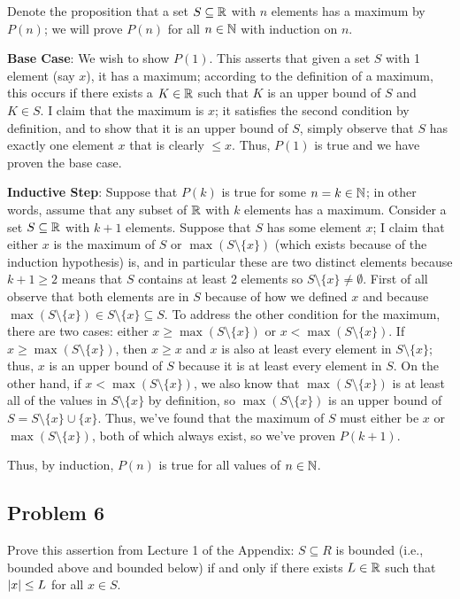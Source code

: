 \documentclass[main.tex]{subfiles}
\begin{document}
\begin{soln}
    Denote the proposition that a set $S\subseteq \mathbb R$ with $n$ elements has a maximum by $P(n)$; we will prove $P(n)$ for all $n\in \mathbb N$ with induction on $n$.

    \textbf{Base Case}: We wish to show $P(1)$. This asserts that given a set $S$ with 1 element (say $x$), it has a maximum; according to the definition of a maximum, this occurs if there exists a $K\in \mathbb R$ such that $K$ is an upper bound of $S$ and $K\in S$. I claim that the maximum is $x$; it satisfies the second condition by definition, and to show that it is an upper bound of $S$, simply observe that $S$ has exactly one element $x$ that is clearly $\le x$. Thus, $P(1)$ is true and we have proven the base case.

    \textbf{Inductive Step}: Suppose that $P(k)$ is true for some $n = k\in \mathbb N$; in other words, assume that any subset of $\mathbb R$ with $k$ elements has a maximum. Consider a set $S\subseteq \mathbb R$ with $k + 1$ elements. Suppose that $S$ has some element $x$; I claim that either $x$ is the maximum of $S$ or $\max (S\setminus \{x\})$ (which exists because of the induction hypothesis) is, and in particular these are two distinct elements because $k + 1\ge 2$ means that $S$ contains at least 2 elements so $S\setminus\{x\}\neq \emptyset$. First of all observe that both elements are in $S$ because of how we defined $x$ and because $\max (S\setminus\{x\})\in S\setminus\{x\}\subseteq S$. To address the other condition for the maximum, there are two cases: either $x \ge \max (S\setminus \{x\})$ or $x < \max (S\setminus \{x\})$. If $x\ge \max (S\setminus \{x\})$, then $x \ge x$ and $x$ is also at least every element in $S\setminus \{x\}$; thus, $x$ is an upper bound of $S$ because it is at least every element in $S$. On the other hand, if $x < \max (S\setminus \{x\})$, we also know that $\max (S\setminus \{x\})$ is at least all of the values in $S\setminus \{x\}$ by definition, so $\max (S\setminus \{x\})$ is an upper bound of $S = S\setminus \{x\} \cup \{x\}$. Thus, we've found that the maximum of $S$ must either be $x$ or $\max (S\setminus \{x\})$, both of which always exist, so we've proven $P(k + 1)$.
    
    Thus, by induction, $P(n)$ is true for all values of $n\in \mathbb N$.
\end{soln}
\eject

\subsection{Problem 6}
\begin{claim}
    Prove this assertion from Lecture 1 of the Appendix: $S \subseteq  R$ is bounded (i.e., bounded above and bounded below) if and only if there exists $L \in \mathbb R$ such that $\left\lvert x \right\rvert\le L$ for all $x \in S$.
\end{claim}
\end{document}
